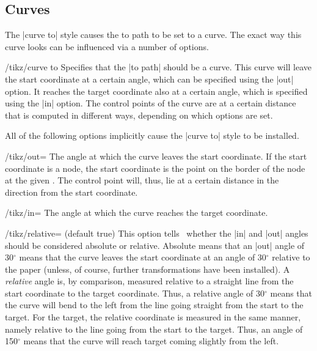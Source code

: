 \subsection{Curves}

The |curve to| style causes the to path to be set to a curve. The
exact way this curve looks can be influenced via a number of options.

\begin{key}{/tikz/curve to}
  Specifies that the |to path| should be a curve. This curve will
  leave the start coordinate at a certain angle, which can be
  specified using the |out| option. It reaches the target coordinate
  also at a certain angle, which is specified using the |in|
  option. The control points of the curve are at a certain distance
  that is computed in different ways, depending on which options are
  set.

  All of the following options implicitly cause the |curve to| style to
  be installed.

  \begin{key}{/tikz/out=}
    The angle at which the curve leaves the start coordinate. If the
    start coordinate is a node, the start coordinate is the point on the
    border of the node at the given . The control point
    will, thus, lie at a certain distance in the direction 
    from the start coordinate.
\begin{codeexample}[]
\end{codeexample}
  \end{key}
  \begin{key}{/tikz/in=}
    The angle at which the curve reaches the target coordinate.
  \end{key}

  \begin{key}{/tikz/relative= (default true)}
    This option tells \tikzname\ whether the |in| and |out| angles
    should be considered absolute or relative. Absolute means that an
    |out| angle of 30$^\circ$ means that the curve leaves the start
    coordinate at an angle of 30$^\circ$ relative to the paper (unless,
    of course, further transformations have been installed). A
    \emph{relative} angle is, by comparison, measured relative to a
    straight line from the start coordinate to the target
    coordinate. Thus, a relative angle of 30$^\circ$ means that the
    curve will bend to the left from the line going straight from the
    start to the target. For the target, the relative coordinate is
    measured in the same manner, namely relative to the line going from
    the start to the target. Thus, an angle of 150$^\circ$ means that
    the curve will reach target coming slightly from the left.


\end{key}
\end{key}
